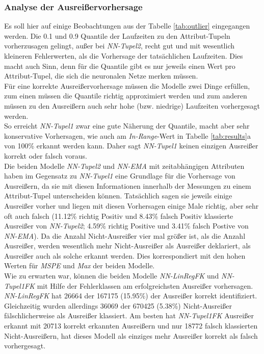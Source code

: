 \documentclass[
	12pt,
	a4paper,
	BCOR10mm,
	DIV14,
	listof=totoc,
	bibliography=totoc,
	headsepline
]{scrreprt}
\begin{document}
\subsubsection{Analyse der Ausreißervorhersage}
Es soll hier auf einige Beobachtungen aus der Tabelle \ref{tab:outlier} eingegangen werden.
Die 0.1 und 0.9 Quantile der Laufzeiten zu den Attribut-Tupeln vorherzusagen gelingt, außer bei \textit{NN-Tupel2}, recht gut und mit wesentlich kleineren Fehlerwerten, als die Vorhersage der tatsächlichen Laufzeiten.
Dies macht auch Sinn, denn für die Quantile gibt es nur jeweils einen Wert pro Attribut-Tupel, die sich die neuronalen Netze \glqq merken \grqq{}müssen.\\
Für eine korrekte Ausreißervorhersage müssen die Modelle zwei Dinge erfüllen, zum einen müssen die Quantile richtig approximiert werden und zum anderen müssen zu den Ausreißern auch sehr hohe (bzw. niedrige) Laufzeiten vorhergesagt werden.\\
So erreicht \textit{NN-Tupel1} zwar eine gute Näherung der Quantile, macht aber sehr konservative Vorhersagen, wie auch am \textit{In-Range}-Wert in Tabelle \ref{tab:results}a von 100\% erkannt werden kann. Daher sagt \textit{NN-Tupel1} keinen einzigen Ausreißer korrekt oder falsch voraus.\\
Die beiden Modelle \textit{NN-Tupel2} und \textit{NN-EMA} mit zeitabhängigen Attributen haben im Gegensatz zu \textit{NN-Tupel1} eine Grundlage für die Vorhersage von Ausreißern, da sie mit diesen Informationen innerhalb der Messungen zu einem Attribut-Tupel unterscheiden können.
Tatsächlich sagen sie jeweils einige Ausreißer vorher und liegen mit diesen Vorhersagen einige Male richtig, aber sehr oft auch falsch (11.12\% richtig Positiv und 8.43\% falsch Positiv klassierte Ausreißer von \textit{NN-Tupel2}; 4.59\% richtig Positive und 3.41\% falsch Postive von \textit{NN-EMA}). Da die Anzahl Nicht-Ausreißer vier mal größer ist, als die Anzahl Ausreißer, werden wesentlich mehr Nicht-Ausreißer als Ausreißer deklariert, als Ausreißer auch als solche erkannt werden. Dies korrespondiert mit den hohen Werten für \textit{MSPE} und \textit{Max} der beiden Modelle.\\
Wie zu erwarten war, können die beiden Modelle \textit{NN-LinRegFK} und \textit{NN-Tupel1FK} mit Hilfe der Fehlerklassen am erfolgreichsten Ausreißer vorhersagen. 
\textit{NN-LinRegFK} hat 26664 der 167175 (15.95\%) der Ausreißer korrekt identifiziert.
Gleichzeitig wurden allerdings 36069 der 670425 (5.38\%) Nicht-Ausreißer fälschlicherweise als Ausreißer klassiert.
Am besten hat \textit{NN-Tupel1FK} Ausreißer erkannt mit 20713 korrekt erkannten Ausreißern und nur 18772 falsch klassierten Nicht-Ausreißern, hat dieses Modell als einziges mehr Ausreißer korrekt als falsch vorhergesagt.\medskip
\end{document}
